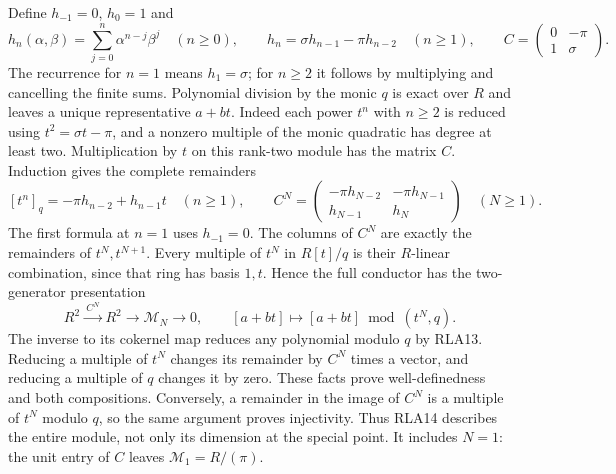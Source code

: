 \documentclass[11pt]{article}
\begin{document}
Define $h_{-1}=0$, $h_0=1$ and
\[
 h_n(\alpha,\beta)=\sum_{j=0}^n\alpha^{n-j}\beta^j\quad(n\ge0),
 \qquad h_n=\sigma h_{n-1}-\pi h_{n-2}\quad(n\ge1),\qquad
 C=\begin{pmatrix}0&-\pi\\1&\sigma\end{pmatrix}.
 \tag{RLA12}
\]
The recurrence for $n=1$ means $h_1=\sigma$; for $n\ge2$ it
follows by multiplying and cancelling the finite sums.
Polynomial division by the monic $q$ is exact over $R$ and leaves
a unique representative $a+bt$.  Indeed each power $t^n$ with
$n\ge2$ is reduced using $t^2=\sigma t-\pi$, and a nonzero
multiple of the monic quadratic has degree at least two.
Multiplication by $t$ on this rank-two module has the matrix $C$.
Induction gives the complete remainders
\[
 [t^n]_q=-\pi h_{n-2}+h_{n-1}t\quad(n\ge1),\qquad
 C^N=\begin{pmatrix}
 -\pi h_{N-2}&-\pi h_{N-1}\\h_{N-1}&h_N
 \end{pmatrix}\quad(N\ge1).
 \tag{RLA13}
\]
The first formula at $n=1$ uses $h_{-1}=0$.
The columns of $C^N$ are exactly the remainders of $t^N,t^{N+1}$.
Every multiple of $t^N$ in $R[t]/q$ is their $R$-linear combination,
since that ring has basis $1,t$.  Hence the full conductor has the
two-generator presentation
\[
 R^2\xrightarrow{\ C^N\ }R^2\longrightarrow\mathcal M_N
 \longrightarrow0,\qquad
 [a+bt]\longmapsto[a+bt]\bmod(t^N,q).
 \tag{RLA14}
\]
The inverse to its cokernel map reduces any polynomial modulo $q$
by RLA13.  Reducing a multiple of $t^N$ changes its remainder by
$C^N$ times a vector, and reducing a multiple of $q$ changes it by
zero.  These facts prove well-definedness and both compositions.
Conversely, a remainder in the image of $C^N$ is a multiple of
$t^N$ modulo $q$, so the same argument proves injectivity.
Thus RLA14 describes the entire module, not only its dimension at
the special point.  It includes $N=1$: the unit entry of $C$ leaves
$\mathcal M_1=R/(\pi)$.
\end{document}
